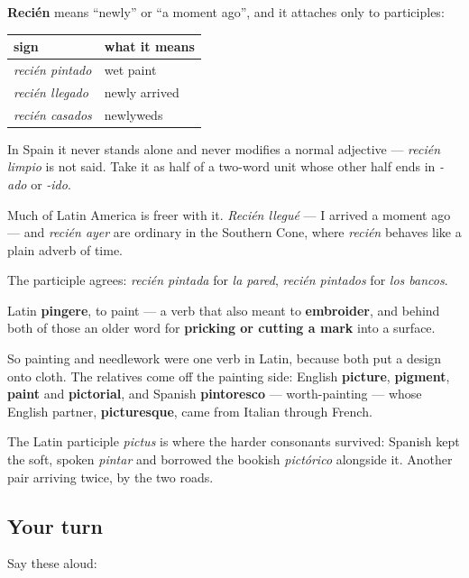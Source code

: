 \begin{grammarlens}[title={Grammar Lens: recién plus a participle}]
\textbf{Recién} means \textquotedblleft{}newly\textquotedblright{} or \textquotedblleft{}a moment ago\textquotedblright{}, and it attaches only to participles:

\noindent
\begin{tabularx}{\linewidth}{@{}>{\raggedright\arraybackslash}X>{\raggedright\arraybackslash}X@{}}
\toprule
\textbf{sign} & \textbf{what it means} \\
\midrule
\emph{recién pintado} & wet paint \\
\emph{recién llegado} & newly arrived \\
\emph{recién casados} & newlyweds \\
\bottomrule
\end{tabularx}

In Spain it never stands alone and never modifies a normal adjective — \emph{recién limpio} is not said. Take it as half of a two-word unit whose other half ends in \emph{-ado} or \emph{-ido}.

Much of Latin America is freer with it. \emph{Recién llegué} — I arrived a moment ago — and \emph{recién ayer} are ordinary in the Southern Cone, where \emph{recién} behaves like a plain adverb of time.

The participle agrees: \emph{recién pintada} for \emph{la pared}, \emph{recién pintados} for \emph{los bancos}.
\end{grammarlens}

\begin{cousinweb}
Latin \textbf{pingere}, to paint — a verb that also meant to \textbf{embroider}, and behind both of those an older word for \textbf{pricking or cutting a mark} into a surface.

So painting and needlework were one verb in Latin, because both put a design onto cloth. The relatives come off the painting side: English \textbf{picture}, \textbf{pigment}, \textbf{paint} and \textbf{pictorial}, and Spanish \textbf{pintoresco} — worth-painting — whose English partner, \textbf{picturesque}, came from Italian through French.

The Latin participle \emph{pictus} is where the harder consonants survived: Spanish kept the soft, spoken \emph{pintar} and borrowed the bookish \emph{pictórico} alongside it. Another pair arriving twice, by the two roads.
\end{cousinweb}

\subsection*{Your turn}
Say these aloud:

